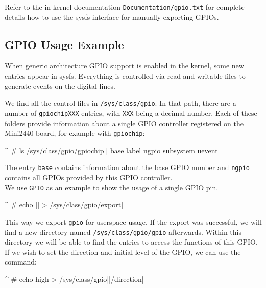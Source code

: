 Refer to the in-kernel documentation \texttt{Documentation/gpio.txt} for
complete details how to use the sysfs-interface for manually exporting GPIOs.


\subsection{GPIO Usage Example}		\label{sec:gpioexample}

When generic architecture GPIO support is enabled in the kernel, some new
entries appear in sysfs. Everything is controlled via read and writable
files to generate events on the digital lines.

We find all the control files in \texttt{/sys/class/gpio}. In that path, there are
a number of \texttt{gpiochipXXX} entries, with \texttt{XXX} being a decimal
number. Each of these folders provide information about a single GPIO
controller registered on the Mini2440 board, for example with
\texttt{gpiochip\perGpioChip}:

\begin{ptxshell}[escapechar=|]{^}
# ls /sys/class/gpio/gpiochip|\perGpioChip |
base       label      ngpio      subsystem  uevent
\end{ptxshell}

The entry \texttt{base} contains information about the base GPIO number and
\texttt{ngpio} contains all GPIOs provided by this GPIO controller.\\
We use \texttt{GPIO\perGpioNumber{}} as an example to show the usage of a
single GPIO pin.

\begin{ptxshell}[escapechar=|]{^}
# echo |\ptxshellcmd\perGpioNumber | > /sys/class/gpio/export|
\end{ptxshell}

This way we export \texttt{gpio\perGpioNumber{}} for userspace usage. If the
export was successful, we will find a new directory named
\texttt{/sys/class/gpio/gpio\perGpioNumber{}} afterwards. Within this directory
we will be able to find the entries to access the functions of this GPIO.
If we wish to set the direction and initial level of the GPIO, we can use the
command:

\begin{ptxshell}[escapechar=|]{^}
# echo high > /sys/class/gpio|\perGpioNumber |/direction|
\end{ptxshell}

